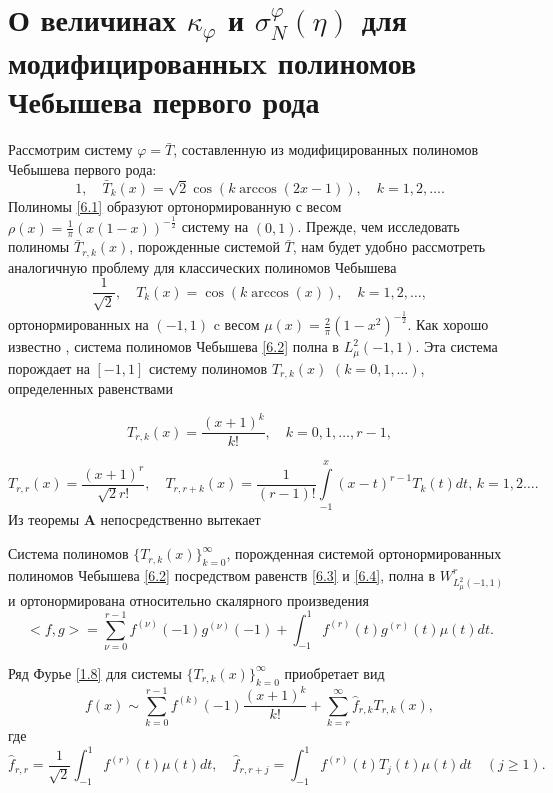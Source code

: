 \section{О величинах  $\kappa_\varphi$ и $\sigma_N^\varphi(\eta)$ для модифицированныx полиномов Чебышева первого рода}


Рассмотрим систему $\varphi=\bar T$, составленную из модифицированных полиномов Чебышева первого рода:
 \begin{equation}\label{6.1}
1,\quad \bar T_k(x)=\sqrt{2}\cos(k\arccos(2x-1)), \quad k=1,2,\ldots.
\end{equation}
 Полиномы \eqref{6.1} образуют ортонормированную   с весом  $\rho(x)=\frac1\pi(x(1-x))^{-\frac12}$ систему на $(0,1)$. Прежде, чем  исследовать полиномы $\bar T_{r,k}(x)$, порожденные системой $\bar T$, нам будет удобно рассмотреть аналогичную проблему для классических  полиномов Чебышева
 \begin{equation}\label{6.2}
\frac{1}{\sqrt{2}},\quad  T_k(x)=\cos(k\arccos(x)), \quad k=1,2,\ldots,
\end{equation}
ортонормированных на $(-1,1)$ c весом  $\mu(x)=\frac2\pi(1-x^2)^{-\frac12}$.
   Как хорошо известно \cite{Sege}, система полиномов Чебышева \eqref{6.2} полна в $L_\mu^2(-1,1)$.   Эта система порождает на $[-1,1]$ систему полиномов $T_{r,k}(x)$ $(k=0,1,\ldots)$, определенных равенствами

  \begin{equation}\label{6.3}
T_{r,k}(x) =\frac{(x+1)^k}{k!}, \quad k=0,1,\ldots, r-1,
\end{equation}

  \begin{equation}\label{6.4}
 T_{r,r}(x) =\frac{(x+1)^r}{\sqrt{2}r!},\quad T_{r,r+k}(x) =\frac{1}{(r-1)!}\int\limits_{-1}^x(x-t)^{r-1}T_k(t)dt, \, k=1,2\ldots.
\end{equation}
Из теоремы \textbf{ A} непосредственно вытекает
\begin{corollary}
  Система полиномов $\{T_{r,k}(x)\}_{k=0}^\infty$, порожденная системой ортонормированных полиномов Чебышева \eqref{6.2} посредством равенств \eqref{6.3} и \eqref{6.4}, полна  в $W^r_{L^2_\mu(-1,1)}$ и ортонормирована относительно скалярного произведения
\begin{equation}\label{6.5}
<f,g>=\sum_{\nu=0}^{r-1}f^{(\nu)}(-1)g^{(\nu)}(-1)+\int_{-1}^{1} f^{(r)}(t)g^{(r)}(t)\mu(t) dt.
\end{equation}
\end{corollary}

Ряд Фурье \eqref{1.8} для системы   $\{T_{r,k}(x)\}_{k=0}^\infty$ приобретает вид
\begin{equation}\label{6.6}
f(x)\sim \sum_{k=0}^{r-1} f^{(k)}(-1)\frac{(x+1)^k}{k!}+ \sum_{k=r}^\infty \hat f_{r,k}T_{r,k}(x),
\end{equation}
где
  \begin{equation}\label{6.7}
\hat f_{r,r}=\frac{1}{\sqrt{2}}\int_{-1}^1 f^{(r)}(t)\mu(t)dt,\quad \hat f_{r,r+j}=\int_{-1}^1 f^{(r)}(t)T_{j}(t)\mu(t)dt\quad(j\ge1).
\end{equation}

